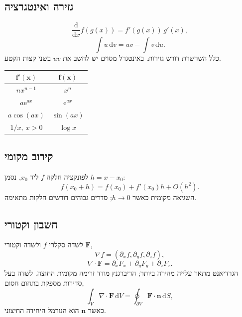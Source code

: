 \begin{referencecolumns}
\begin{referenceentry}
\section{גזירה ואינטגרציה}
\[
\frac{\mathrm d}{\mathrm dx}f(g(x))=f'(g(x))\,g'(x),
\]
\[
\int u\,\mathrm dv=uv-\int v\,\mathrm du.
\]
כלל השרשרת דורש גזירות. באינטגרל מסוים יש לחשב
את $uv$ בשני קצות הקטע.
\begin{referencetable}
\centering
\setlength{\arrayrulewidth}{0.4pt}
\setlength{\tabcolsep}{4pt}
\renewcommand{\arraystretch}{1.05}
\begin{otherlanguage}{english}
\begin{tabular}{|c|c|}
\hline
\rowcolor{black!10}
$\boldsymbol{f'(x)}$ & $\boldsymbol{f(x)}$\\\hline
$nx^{n-1}$ & $x^n$\\\hline
$a\mathrm e^{ax}$ & $\mathrm e^{ax}$\\\hline
$a\cos(ax)$ & $\sin(ax)$\\\hline
$1/x,\ x>0$ & $\log x$\\\hline
\end{tabular}
\end{otherlanguage}
\end{referencetable}
\subsection{קירוב מקומי}
לפונקציה חלקה $f$ ליד $x_0$, נסמן $h=x-x_0$:
\[
f(x_0+h)=f(x_0)+f'(x_0)h+O(h^2).
\]
השגיאה מקומית כאשר $h\to0$; סדרים גבוהים דורשים חלקות מתאימה.
\end{referenceentry}

\begin{referenceentry}
\section{חשבון וקטורי}
לשדה סקלרי $f$ ולשדה וקטורי $\mathbf F$,
\[
\nabla f=(\partial_x f,\partial_y f,\partial_z f),
\]
\[
\nabla\cdot\mathbf F=\partial_x F_x+\partial_y F_y+\partial_z F_z.
\]
הגרדיאנט מתאר עלייה מהירה ביותר; הדיברגנץ מודד זרימה מקומית החוצה.
לשדה בעל סדירות מספקת בתחום חסום,
\[
\int_V\nabla\cdot\mathbf F\,\mathrm dV
=\oint_{\partial V}\mathbf F\cdot\mathbf n\,\mathrm dS,
\]
כאשר $\mathbf n$ הוא הנורמל היחידה החיצוני.
\end{referenceentry}


\end{referencecolumns}
